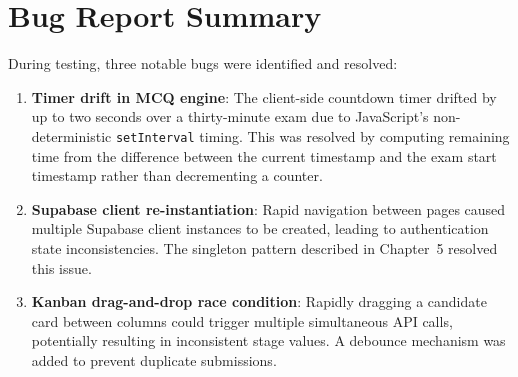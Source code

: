 \section{Bug Report Summary}
\label{sec:bugs}

During testing, three notable bugs were identified and resolved:

\begin{enumerate}[leftmargin=1.5em]
  \item \textbf{Timer drift in MCQ engine}: The client-side countdown timer drifted by up to two seconds over a thirty-minute exam due to JavaScript's non-deterministic \texttt{setInterval} timing. This was resolved by computing remaining time from the difference between the current timestamp and the exam start timestamp rather than decrementing a counter.

  \item \textbf{Supabase client re-instantiation}: Rapid navigation between pages caused multiple Supabase client instances to be created, leading to authentication state inconsistencies. The singleton pattern described in Chapter~5 resolved this issue.

  \item \textbf{Kanban drag-and-drop race condition}: Rapidly dragging a candidate card between columns could trigger multiple simultaneous API calls, potentially resulting in inconsistent stage values. A debounce mechanism was added to prevent duplicate submissions.
\end{enumerate}
